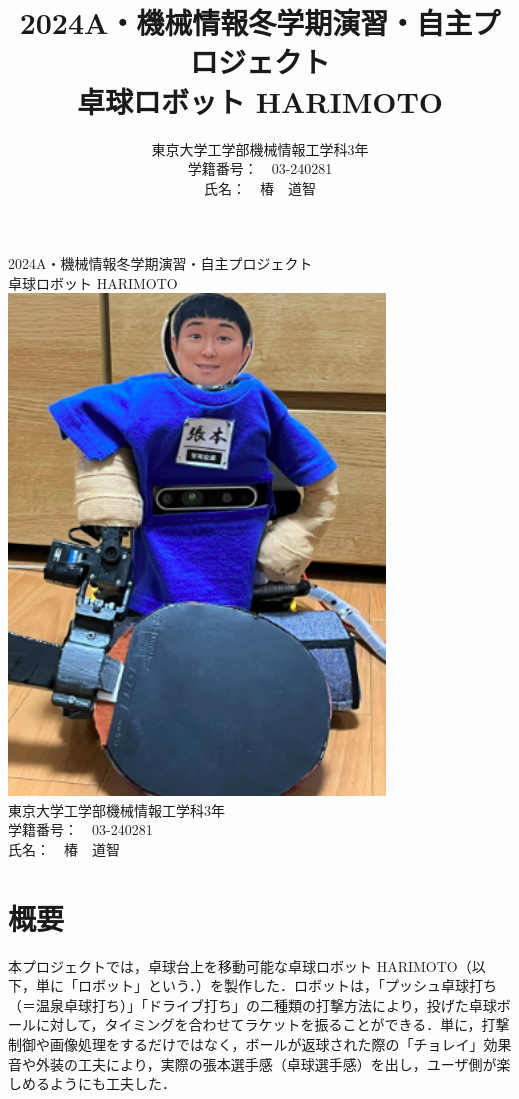 \documentclass[10pt, oneside, titlepage]{ltjarticle}  %
\title{ \large{2024A・機械情報冬学期演習・自主プロジェクト}\\
\vspace{1cm}
\Huge{卓球ロボット HARIMOTO}}
\author{東京大学工学部機械情報工学科3年 \\
学籍番号：　03-240281 \\
氏名：　椿　道智}
\begin{document}
\begin{titlepage}
  \begin{center}
  \Large{2024A・機械情報冬学期演習・自主プロジェクト}\\
  \vspace{1cm}
  \Huge{卓球ロボット HARIMOTO}\\
  \vspace{1cm}
  \includegraphics[width=10cm]{figures/HARIMOTO.png}\\
  \vspace{2cm}
  \Large{
  東京大学工学部機械情報工学科3年\\
  学籍番号：　03-240281\\
  氏名：　椿　道智
  }
  \end{center}
\end{titlepage}
\section{概要}
本プロジェクトでは，卓球台上を移動可能な卓球ロボット HARIMOTO（以下，単に「ロボット」という．）を製作した．ロボットは，「プッシュ卓球打ち（＝温泉卓球打ち）」「ドライブ打ち」の二種類の打撃方法により，投げた卓球ボールに対して，タイミングを合わせてラケットを振ることができる．単に，打撃制御や画像処理をするだけではなく，ボールが返球された際の「チョレイ」効果音や外装の工夫により，実際の張本選手感（卓球選手感）を出し，ユーザ側が楽しめるようにも工夫した．
\end{document}
